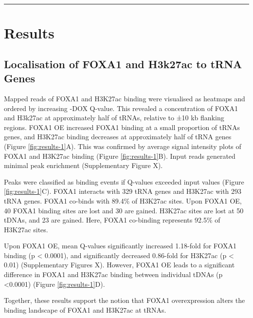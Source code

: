 \documentclass[
  11pt,
]{article}
\begin{document}
\begin{center}\rule{0.5\linewidth}{0.5pt}\end{center}

\hypertarget{results}{%
\section{Results}\label{results}}

\hypertarget{localisation-of-foxa1-and-h3k27ac-to-trna-genes}{%
\subsection{Localisation of FOXA1 and H3k27ac to tRNA Genes}\label{localisation-of-foxa1-and-h3k27ac-to-trna-genes}}

Mapped reads of FOXA1 and H3K27ac binding were visualised as heatmaps and ordered by increasing -DOX Q-value.
This revealed a concentration of FOXA1 and H3k27ac at approximately half of tRNAs, relative to ±10 kb flanking regions.
FOXA1 OE increased FOXA1 binding at a small proportion of tRNAs genes, and H3K27ac binding decreases at approximately half of tRNA genes (Figure \ref{fig:results-1}A).
This was confirmed by average signal intensity plots of FOXA1 and H3K27ac binding (Figure \ref{fig:results-1}B).
Input reads generated minimal peak enrichment (Supplementary Figure X).

Peaks were classified as binding events if Q-values exceeded input values (Figure \ref{fig:results-1}C).
FOXA1 interacts with 329 tRNA genes and H3K27ac with 293 tRNA genes.
FOXA1 co-binds with 89.4\% of H3K27ac sites.
Upon FOXA1 OE, 40 FOXA1 binding sites are lost and 30 are gained.
H3K27ac sites are lost at 50 tDNAs, and 23 are gained.
Here, FOXA1 co-binding represents 92.5\% of H3K27ac sites.

Upon FOXA1 OE, mean Q-values significantly increased 1.18-fold for FOXA1 binding (p \textless{} 0.0001), and significantly decreased 0.86-fold for H3K27ac (p \textless{} 0.01) (Supplementary Figures X).
However, FOXA1 OE leads to a significant difference in FOXA1 and H3K27ac binding between individual tDNAs (p \textless0.0001) (Figure \ref{fig:results-1}D).

Together, these results support the notion that FOXA1 overexpression alters the binding landscape of FOXA1 and H3K27ac at tRNAs.
\end{document}
